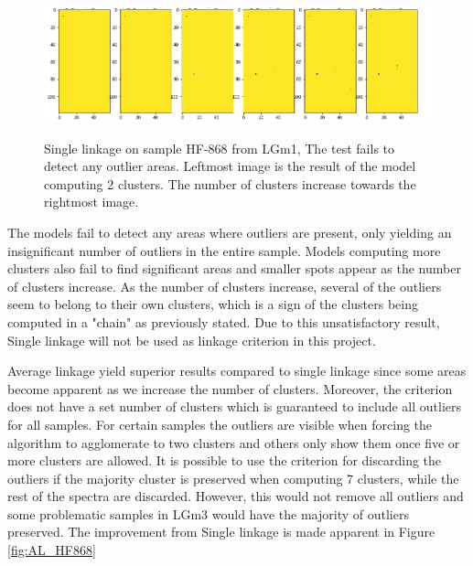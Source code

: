 \begin{figure}[H]

    \centering
{\includegraphics[width=15cm]{images/Single_linkage/LGm-1/HF-868_1_2.h5_0.png} }
\caption{Single linkage on sample HF-868 from LGm1, The test fails to detect any outlier areas. Leftmost image is the result of the model computing 2 clusters. The number of clusters increase towards the rightmost image.\label{fig:SL_HF868}}%

\end{figure}

The models fail to detect any areas where outliers are present, only yielding an insignificant number of outliers in the entire sample. Models computing more clusters also fail to find significant areas and smaller spots appear as the number of clusters increase. As the number of clusters increase, several of the outliers seem to belong to their own clusters, which is a sign of the clusters being computed in a "chain" as previously stated. Due to this unsatisfactory result, Single linkage will not be used as linkage criterion in this project.


Average linkage yield superior results compared to single linkage since some areas become apparent as we increase the number of clusters. Moreover, the criterion does not have a set number of clusters which is guaranteed to include all outliers for all samples. For certain samples the outliers are visible when forcing the algorithm to agglomerate to two clusters and others only show them once five or more clusters are allowed. It is possible to use the criterion for discarding the outliers if the majority cluster is preserved when computing 7 clusters, while the rest of the spectra are discarded. However, this would not remove all outliers and some problematic samples in LGm3 would have the majority of outliers preserved. The improvement from Single linkage is made apparent in Figure \ref{fig:AL_HF868}

